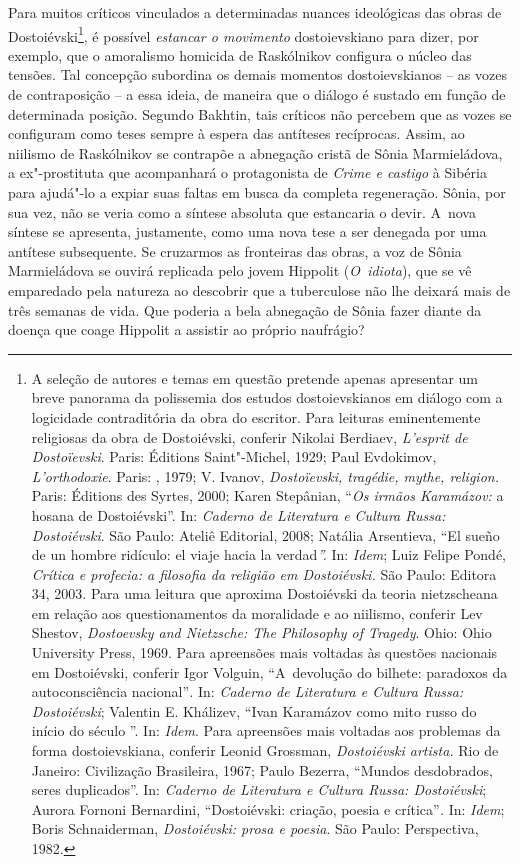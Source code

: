 {Para muitos críticos vinculados a determinadas nuances ideológicas das
obras de Dostoiévski\footnote{A seleção de autores e temas em questão
  pretende apenas apresentar um breve panorama da polissemia dos estudos
  dostoievskianos em diálogo com a logicidade contraditória da obra do
  escritor. Para leituras eminentemente religiosas da obra de
  Dostoiévski, conferir Nikolai Berdiaev, \emph{L'esprit de
  Dostoïevski}. Paris: Éditions Saint"-Michel, 1929; Paul Evdokimov,
  \emph{L'orthodoxie}. Paris: , 1979; V. Ivanov, \emph{Dostoïevski,
  tragédie, mythe, religion.} Paris: Éditions des Syrtes, 2000; Karen
  Stepânian, ``\emph{Os irmãos Karamázov:} a hosana de Dostoiévski''.
  In: \emph{Caderno de Literatura e Cultura Russa: Dostoiévski}. São
  Paulo: Ateliê Editorial, 2008; Natália Arsentieva, ``El sueño de un
  hombre ridículo: el viaje hacia la verdad\emph{''.} In: \emph{Idem};
  Luiz Felipe Pondé, \emph{Crítica e profecia: a filosofia da religião
  em Dostoiévski.} São Paulo: Editora 34, 2003. Para uma leitura que
  aproxima Dostoiévski da teoria nietzscheana em relação aos
  questionamentos da moralidade e ao niilismo, conferir Lev Shestov,
  \emph{Dostoevsky and Nietzsche: The Philosophy of Tragedy}. Ohio: Ohio
  University Press, 1969. Para apreensões mais voltadas às questões
  nacionais em Dostoiévski, conferir Igor Volguin, ``A~devolução do
  bilhete: paradoxos da autoconsciência nacional''\emph{.} In:
  \emph{Caderno de Literatura e Cultura Russa: Dostoiévski}; Valentin E.
  Khálizev, ``Ivan Karamázov como mito russo do início do século ''.
  In: \emph{Idem}. Para apreensões mais voltadas aos problemas da forma
  dostoievskiana, conferir Leonid Grossman, \emph{Dostoiévski artista.}
  Rio de Janeiro: Civilização Brasileira, 1967; Paulo Bezerra, ``Mundos
  desdobrados, seres duplicados''. In: \emph{Caderno de Literatura e
  Cultura Russa: Dostoiévski}; Aurora Fornoni Bernardini, ``Dostoiévski:
  criação, poesia e crítica''\emph{.} In: \emph{Idem}; Boris
  Schnaiderman, \emph{Dostoiévski: prosa e poesia}. São Paulo:
  Perspectiva, 1982.}, é possível \emph{estancar o movimento}
dostoievskiano para dizer, por exemplo, que o amoralismo homicida de
Raskólnikov configura o núcleo das tensões. Tal concepção subordina os
demais momentos dostoievskianos -- as vozes de contraposição -- a essa
ideia, de maneira que o diálogo é sustado em função de determinada
posição. Segundo Bakhtin, tais críticos não percebem que as vozes se
configuram como teses sempre à espera das antíteses recíprocas. Assim,
ao niilismo de Raskólnikov se contrapõe a abnegação cristã de Sônia
Marmieládova, a ex"-prostituta que acompanhará o protagonista de
\emph{Crime e castigo} à Sibéria para ajudá"-lo a expiar suas faltas em
busca da completa regeneração. Sônia, por sua vez, não se veria como a
síntese absoluta que estancaria o devir. A~nova síntese se apresenta,
justamente, como uma nova tese a ser denegada por uma antítese
subsequente. Se cruzarmos as fronteiras das obras, a voz de Sônia
Marmieládova se ouvirá replicada pelo jovem Hippolit (\emph{O~idiota}),
que se vê emparedado pela natureza ao descobrir que a tuberculose não
lhe deixará mais de três semanas de vida. Que poderia a bela abnegação
de Sônia fazer diante da doença que coage Hippolit a assistir ao próprio
naufrágio?

}
